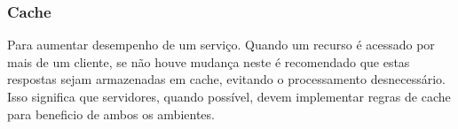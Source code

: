 \subsubsection[Cache]{Cache}

Para aumentar desempenho de um serviço. Quando um recurso é acessado por mais de um cliente, se não houve mudança neste é recomendado que estas respostas sejam armazenadas em cache, evitando o processamento desnecessário. Isso significa que servidores, quando possível, devem implementar regras de cache para beneficio de ambos os ambientes. \cite{Fielding2000}
